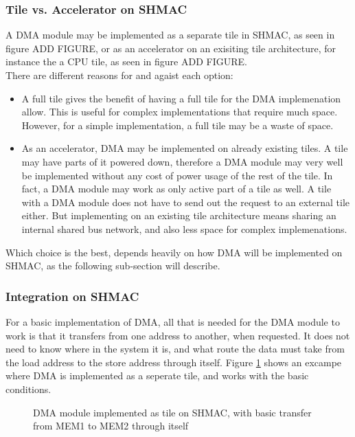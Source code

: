 \subsubsection{Tile vs. Accelerator on SHMAC}

A DMA module may be implemented as a separate tile in SHMAC, as seen in figure  ADD FIGURE, or as an accelerator on an exisiting tile architecture, for instance the a CPU tile, as seen in figure  ADD FIGURE.
\\ There are different reasons for and agaist each option:
\begin{itemize}
    \item A full tile gives the benefit of having a full tile for the DMA implemenation allow.
    This is useful for complex implementations that require much space.
    However, for a simple implementation, a full tile may be a waste of space.
    \item As an accelerator, DMA may be implemented on already existing tiles.
    A tile may have parts of it powered down, therefore a DMA module may very well be implemented without any cost of power usage of the rest of the tile.
    In fact, a DMA module may work as only active part of a tile as well.
    A tile with a DMA module does not have to send out the request to an external tile either.
    But implementing on an existing tile architecture means sharing an internal shared bus network, and also less space for complex implemenations.
\end{itemize}
Which choice is the best, depends heavily on how DMA will be implemented on SHMAC, as the following sub-section will describe.

\subsubsection{Integration on SHMAC}
For a basic implementation of DMA, all that is needed for the DMA module to work is that it transfers from one address to another, when requested.
It does not need to know where in the system it is, and what route the data must take from the load address to the store address through itself.
Figure \ref{fig:DMASHMAC1} shows an excampe where DMA is implemented as a seperate tile, and works with the basic conditions.

\begin{figure}[h!]
    \centering
    \caption{DMA module implemented as tile on SHMAC, with basic transfer from MEM1 to MEM2 through itself}
    \label{fig:DMASHMAC1}
\end{figure}
 
